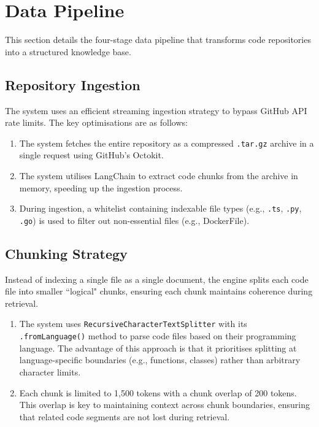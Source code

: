 \section{Data Pipeline}
This section details the four-stage data pipeline that transforms code repositories into a structured knowledge base.
\subsection{Repository Ingestion}
The system uses an efficient streaming ingestion strategy to bypass GitHub API rate limits. The key optimisations are as follows:
\begin{enumerate}
    \item The system fetches the entire repository as a compressed \texttt{.tar.gz} archive in a single request using GitHub's Octokit.
    \item The system utilises LangChain to extract code chunks from the archive in memory, speeding up the ingestion process.
    \item During ingestion, a whitelist containing indexable file types (e.g., \texttt{.ts}, \texttt{.py}, \texttt{.go}) is used to filter out non-essential files (e.g., DockerFile).
\end{enumerate}
\subsection{Chunking Strategy}
Instead of indexing a single file as a single document, the engine splits each code file into smaller ``logical" chunks, ensuring each chunk maintains coherence during retrieval.
\begin{enumerate}
    \item The system uses \texttt{RecursiveCharacterTextSplitter} with its \texttt{.fromLanguage()} method to parse code files based on their programming language. The advantage of this approach is that it prioritises splitting at language-specific boundaries (e.g., functions, classes) rather than arbitrary character limits.
    \item Each chunk is limited to 1,500 tokens with a chunk overlap of 200 tokens. This overlap is key to maintaining context across chunk boundaries, ensuring that related code segments are not lost during retrieval.
\end{enumerate}

